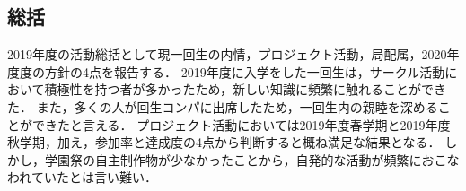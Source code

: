 \subsection*{\firstGrade{}総括}




2019年度の活動総括として現一回生の内情，プロジェクト活動，局配属，2020年度度の方針の4点を報告する．
2019年度に入学をした一回生は，サークル活動において積極性を持つ者が多かったため，新しい知識に頻繁に触れることができた．
また，多くの人が回生コンパに出席したため，一回生内の親睦を深めることができたと言える．
プロジェクト活動においては2019年度春学期と2019年度秋学期，加え，参加率と達成度の4点から判断すると概ね満足な結果となる．
しかし，学園祭の自主制作物が少なかったことから，自発的な活動が頻繁におこなわれていたとは言い難い．

